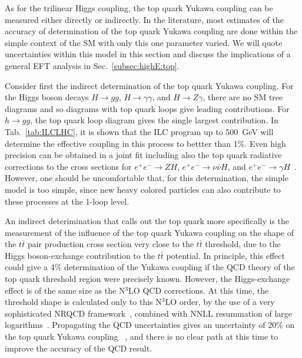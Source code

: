 As for the trilinear Higgs coupling, the top quark Yukawa coupling can be
measured either directly or indirectly.  In the literature, most
estimates of the accuracy of determination of the top quark Yukawa
coupling are done within the simple context of the SM with only this
one parameter varied.   We will quote uncertainties
within
this model in this section and discuss the implications of a general 
EFT analysis in Sec.~\ref{subsec:highE:top}.

Consider first the indirect determination of the top quark Yukawa coupling.
   For the Higgs boson decays
$H\to gg$, $H\to \gamma\gamma$, and $H\to Z \gamma$, there are no SM tree
diagrams
and so diagrams with top quark loops give leading contributions.  For
$h\to gg$, the top quark loop diagram gives the single largest
contribution.   In Tab.~\ref{tab:ILCLHC}, it is shown that the ILC
program up to 
500~GeV will determine the effective coupling in this process to bettter
than 1\%.    Even high precision can be obtained in a joint fit
including also the top quark radiative corrections to the cross
sections for $e^+e^- \rightarrow ZH$, $e^+e^- \rightarrow \nu\bar\nu
H$, and $e^+e^- \to  \gamma H$~\cite{Boselli:2018zxr}.   However, one
should be uncomfortable that, for this determination, the simple model is
too simple, since new heavy colored particles can also contribute to
these processes at the 1-loop level.

An indirect deterimination that calls out the top quark more
specifically is the measurement of the influence of the top quark
Yukawa coupling on the shape of the  $t\bar{t}$ pair production 
cross section very close to the $t\bar{t}$ threshold, due to the Higgs
boson-exchange contribution to the $t\bar t$ potential. In principle,
this effect could give a 4\% determination of the Yukawa coupling if
the QCD  theory of the top quark threshold region were precisely
known.   However, the Higgs-exchange effect is of the same size as
the N$^3$LO QCD corrections.  At this time, the threshold shape is
calculated only to this N$^3$LO order, by the use of a very sophisticated
NRQCD framework~\cite{Beneke:2015kwa}, combined with NNLL resummation of
large logarithms~\cite{Hoang:2013uda}.   Propagating the QCD
uncertainties gives an uncertainty of 20\% on the top quark Yukawa
coupling~\cite{Vos:2016til} , and there is no clear path at this time to improve the
accuracy of the QCD result.

